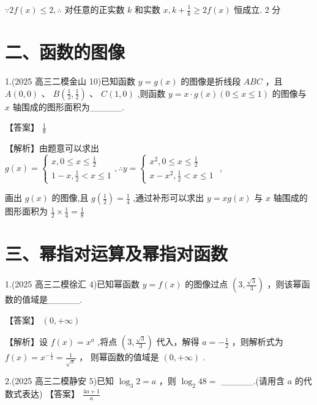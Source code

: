 \documentclass[10pt]{article}
\begin{document}
\(\because {2f}\left( x\right)  \leq  2,\therefore\) 对任意的正实数 \(k\) 和实数 \(x,k + \frac{1}{k} \geq  {2f}\left( x\right)\) 恒成立. 2 分

\section*{二、函数的图像}

1.(2025 高三二模金山 10)已知函数 \(y = g\left( x\right)\) 的图像是折线段 \({ABC}\) ，且 \(A\left( {0,0}\right)\) 、 \(B\left( {\frac{1}{2},\frac{1}{2}}\right)\) 、 \(C\left( {1,0}\right)\) ,则函数 \(y = x \cdot  g\left( x\right) \left( {0 \leq  x \leq  1}\right)\) 的图像与 \(x\) 轴围成的图形面积为\_\_\_\_\_.

【答案】 \(\frac{1}{8}\)

【解析】由题意可以求出 \(g\left( x\right)  = \left\{  {\begin{array}{l} x,0 \leq  x \leq  \frac{1}{2} \\  1 - x,\frac{1}{2} < x \leq  1 \end{array},\therefore y = \left\{  \begin{array}{l} {x}^{2},0 \leq  x \leq  \frac{1}{2} \\  x - {x}^{2},\frac{1}{2} < x \leq  1 \end{array}\right. }\right.\) ,

画出 \(g\left( x\right)\) 的图像,且 \(g\left( \frac{1}{2}\right)  = \frac{1}{4}\) ,通过补形可以求出 \(y = {xg}\left( x\right)\) 与 \(x\) 轴围成的图形面积为 \(\frac{1}{2} \times  \frac{1}{4} = \frac{1}{8}\)

\section*{三、幂指对运算及幂指对函数}

1.(2025 高三二模徐汇 4)已知幂函数 \(y = f\left( x\right)\) 的图像过点 \(\left( {3,\frac{\sqrt{3}}{3}}\right)\) ，则该幂函数的值域是\_\_\_\_\_.

【答案】 \(\left( {0, + \infty }\right)\)

【解析】设 \(f\left( x\right)  = {x}^{a}\) ,将点 \(\left( {3,\frac{\sqrt{3}}{3}}\right)\) 代入，解得 \(a =  - \frac{1}{2}\) ，则解析式为 \(f\left( x\right)  = {x}^{-\frac{1}{2}} = \frac{1}{\sqrt{x}}\) ， 则幂函数的值域是 \(\left( {0, + \infty }\right)\) .

2.(2025 高三二模静安 5)已知 \({\log }_{3}2 = a\) ，则 \({\log }_{2}{48} =\) \_\_\_\_\_.(请用含 \(a\) 的代数式表达) 【答案】 \(\frac{{4a} + 1}{a}\)
\end{document}

